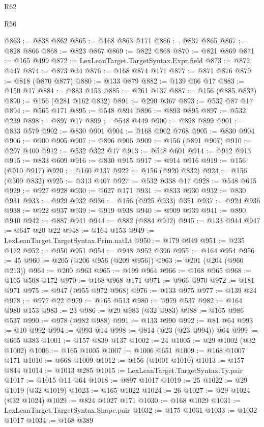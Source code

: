 \begin{lexlean}{R62}
\begin{lexlean}{R56}
\begin{coremodule}
{{{{{{{{{{{{{{{{{{{{{{{{{{{{{{{{{{{{{{{{{{{{{{{{{{{{{{{{{{{{{{{{{{{{{{{{{{{{{{{{{{{{{{{{{{{{{{{{{{{{{{{{{{{{{{{{{{{{{{{{{{{{{{{{{{{{{{{{{{{{{{{{{{{{{{{{{{{{{{{{{{{{{{{{{{{{{{{{{{{{{{{{{{{{{{{{{{{{{{{{{{{{{{{{{{{@863 := @838 @862
@865 := @168 @863 @171
@866 := @837 @865
@867 := @828 @866
@868 := @823 @867
@869 := @822 @868
@870 := @821 @869
@871 := @165 @499
@872 := LexLeanTarget.TargetSyntax.Expr.field
@873 := @872 @447
@874 := @873 @34
@876 := @168 @874 @171
@877 := @871 @876
@879 := @818 (@870 @877)
@880 := @133 @879
@882 := @139 @66 @17
@883 := @150 @17
@884 := @883 @153
@885 := @261 @137
@887 := @156 (@885 @832)
@890 := @156 (@281 @162 @832)
@891 := @290 @367
@893 := @532 @87 @17
@894 := @565 @171
@895 := @548 @894
@896 := @893 @895
@897 := @532 @239
@898 := @897 @17
@899 := @548 @449
@900 := @898 @899
@901 := @833 @579
@902 := @830 @901
@904 := @168 @902 @768
@905 := @830 @904
@906 := @900 @905
@907 := @896 @906
@909 := @156 (@891 @907)
@910 := @297 @400
@912 := @532 @322 @17
@913 := @548 @601
@914 := @912 @913
@915 := @833 @609
@916 := @830 @915
@917 := @914 @916
@919 := @156 (@910 @917)
@920 := @160 @137
@922 := @156 (@920 @832)
@924 := @156 (@309 @832)
@925 := @313 @407
@927 := @532 @338 @17
@928 := @548 @615
@929 := @927 @928
@930 := @627 @171
@931 := @833 @930
@932 := @830 @931
@933 := @929 @932
@936 := @156 (@925 @933) @351
@937 := @924 @936
@938 := @922 @937
@939 := @919 @938
@940 := @909 @939
@941 := @890 @940
@942 := @887 @941
@944 := @882 (@884 @942)
@945 := @133 @944
@947 := @647 @20 @22
@948 := @164 @153
@949 := LexLeanTarget.TargetSyntax.Prim.natLt
@950 := @179 @949
@951 := @235 @172
@952 := @950 @951
@954 := @948 @952 @396
@955 := @164 @954
@956 := 45
@960 := @205 (@206 @956 (@209 @956))
@963 := @201 (@204 (@960 @213))
@964 := @200 @963
@965 := @199 @964
@966 := @168 @965
@968 := @165 @508 @172
@970 := @168 @968 @171
@971 := @966 @970
@972 := @181 @971
@975 := @947 (@955 @972 @968)
@976 := @133 @975
@977 := @139 @24
@978 := @977 @22
@979 := @165 @513
@980 := @979 @537
@982 := @164 @980 @153
@983 := 23
@986 := @29 @983 (@32 @983)
@988 := @165 @986 @537
@990 := @978 (@982 @988)
@991 := @133 @990
@992 := @81 @64
@993 := @10 @992
@994 := @993 @14
@998 := @814 (@23 (@23 @994)) @64
@999 := @665 @383
@1001 := @157 @839 @137
@1002 := 24
@1005 := @29 @1002 (@32 @1002)
@1006 := @165 @1005
@1007 := @1006 @651
@1009 := @168 @1007 @171
@1010 := @668 @1009
@1012 := @156 (@1001 @1010)
@1013 := @157 @844
@1014 := @1013 @285
@1015 := LexLeanTarget.TargetSyntax.Ty.pair
@1017 := @1015 @11 @64
@1018 := @897 @1017
@1019 := 25
@1022 := @29 @1019 (@32 @1019)
@1023 := @165 @1022
@1024 := 26
@1027 := @29 @1024 (@32 @1024)
@1029 := @824 @1027 @171
@1030 := @168 @1029
@1031 := LexLeanTarget.TargetSyntax.Shape.pair
@1032 := @175 @1031
@1033 := @1032 @1017
@1034 := @168 @389
}}}}}}}}}}}}}}}}}}}}}}}}}}}}}}}}}}}}}}}}}}}}}}}}}}}}}}}}}}}}}}}}}}}}}}}}}}}}}}}}}}}}}}}}}}}}}}}}}}}}}}}}}}}}}}}}}}}}}}}}}}}}}}}}}}}}}}}}}}}}}}}}}}}}}}}}}}}}}}}}}}}}}}}}}}}}}}}}}}}}}}}}}}}}}}}}}}}}}}}}}}}}}}}}}}}
\end{coremodule}
\end{lexlean}
\end{lexlean}
